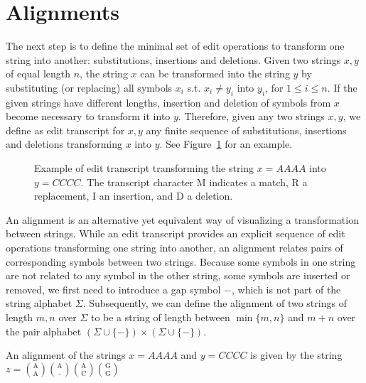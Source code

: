 \section{Alignments}

The next step is to define the minimal set of edit operations to transform one string into another: substitutions, insertions and deletions.
Given two strings $x,y$ of equal length $n$, the string $x$ can be transformed into the string $y$ by substituting (or replacing) all symbols $x_i$ s.t. $x_i \neq y_i$ into $y_i$, for $1 \leq i \leq n$.
If the given strings have different lengths, insertion and deletion of symbols from $x$ become necessary to transform it into $y$.
Therefore, given any two strings $x,y$, we define as edit transcript for $x,y$ any finite sequence of substitutions, insertions and deletions transforming $x$ into $y$.
See Figure~\ref{fig:edit-transcript} for an example.

\begin{figure}[h]
\begin{center}
\caption[Example of edit transcript.]{Example of edit transcript transforming the string $x=AAAA$ into $y=CCCC$. The transcript character M indicates a match, R a replacement, I an insertion, and D a deletion.}
\label{fig:edit-transcript}

\end{center}
\end{figure}

An alignment is an alternative yet equivalent way of visualizing a transformation between strings.
While an edit transcript provides an explicit sequence of edit operations transforming one string into another, an alignment relates pairs of corresponding symbols between two strings.
Because some symbols in one string are not related to any symbol in the other string, \ie some symbols are inserted or removed, we first need to introduce a gap symbol $-$, which is not part of the string alphabet $\Sigma$.
Subsequently, we can define the alignment of two strings of length $m,n$ over $\Sigma$ to be a string of length between $\min\{m,n\}$ and $m+n$ over the pair alphabet $(\Sigma \cup \{ - \}) \times (\Sigma \cup \{ - \})$.

\begin{example}
\label{ex:alignment}
An alignment of the strings $x=AAAA$ and $y=CCCC$ is given by the string
$z={\text{A} \choose \text{A}}{\text{A} \choose \text{-}}{\text{A} \choose \text{C}}{\text{G} \choose \text{G}}$
\end{example}

